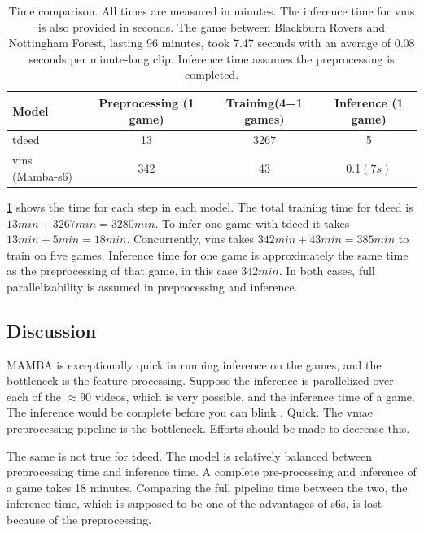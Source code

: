 


\begin{table}[ht]
    \centering
    \begin{tabular}{lccc}
        \toprule 
        Model & Preprocessing (1 game)  & Training(4+1 games) & Inference (1 game) \\
        \midrule
        \acrshort{tdeed} & 13 & 3267 & 5\\
        \acrshort{vms} (Mamba-\acrshort{s6}) & 342 & 43 & 0.1$(7s)$ \\
        \bottomrule
    \end{tabular}
    \caption{Time comparison. All times are measured in minutes. The inference time for \acrshort{vms} is also provided in seconds. The game between Blackburn Rovers and Nottingham Forest, lasting 96 minutes, took 7.47 seconds with an average of 0.08 seconds per minute-long clip. Inference time assumes the preprocessing is completed.}
    \label{tab:results_ex2}
\end{table}

\cref{tab:results_ex2} shows the time for each step in each model. The total training time for \acrshort{tdeed} is \(13min+3267min= 3280min\). To infer one game with \acrshort{tdeed} it takes \(13min+5min=18min\). Concurrently, \acrshort{vms} takes \(342min+43min=385min\) to train on five games. Inference time for one game is approximately the same time as the preprocessing of that game, in this case \(342min\). In both cases, full parallelizability is assumed in preprocessing and inference. 

\subsection{Discussion}
\label{ssec:ex2_discussion}

MAMBA is exceptionally quick in running inference on the games, and the bottleneck is the feature processing. Suppose the inference is parallelized over each of the $\approx90$ videos, which is very possible, and the inference time of a game. The inference would be complete before you can blink \cite{bartoshuk_blinking_1977}. Quick. The \acrshort{vmae} preprocessing pipeline is the bottleneck. Efforts should be made to decrease this. 


The same is not true for \acrshort{tdeed}. The model is relatively balanced between preprocessing time and inference time. A complete pre-processing and inference of a game takes 18 minutes. Comparing the full pipeline time between the two, the inference time, which is supposed to be one of the advantages of \acrlong{s6}s, is lost because of the preprocessing. 



